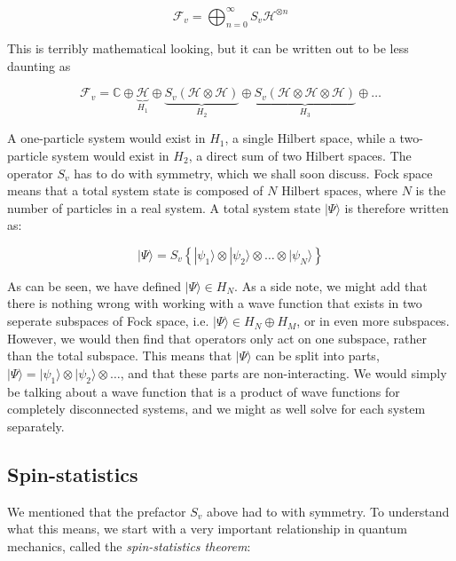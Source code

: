 \documentclass[10pt,twoside]{report}
\begin{document}
	\begin{equation}
		\mathcal{F}_v = \bigoplus_{n=0}^\infty S_v \mathcal{H}^{\otimes n}
	\end{equation}
	
	This is terribly mathematical looking, but it can be written out to be less daunting as
	
	\begin{equation}
		\mathcal{F}_v = \mathds{C}\oplus \underbrace{\mathcal{H}}_{H_1} \oplus \underbrace{S_v(\mathcal{H}\otimes \mathcal{H})}_{H_2} \oplus \underbrace{S_v(\mathcal{H}\otimes \mathcal{H}\otimes \mathcal{H})}_{H_3} \oplus \ldots
	\end{equation}
	
	
	A one-particle system would exist in $H_1$, a single Hilbert space, while a two-particle system would exist in $H_2$, a direct sum of two Hilbert spaces. The operator $S_v$ has to do with symmetry, which we shall soon discuss.
	Fock space means that a total system state is composed of $N$ Hilbert spaces, where $N$ is the number of particles in a real system. A total system state $|\Psi\rangle$ is therefore written as:
	
	\begin{equation}
		|\Psi\rangle = S_v\left\{|\psi_1\rangle \otimes |\psi_2\rangle \otimes \ldots \otimes |\psi_N\rangle\right\}
	\end{equation}
	
	As can be seen, we have defined $|\Psi\rangle \in H_N$. As a side note, we might add that there is nothing wrong with working with a wave function that exists in two seperate subspaces of Fock space, i.e. $|\Psi\rangle \in H_N\oplus H_M$, or in even more subspaces. However, we would then find that operators only act on one subspace, rather than the total subspace. This means that $|\Psi\rangle$ can be split into parts, $|\Psi\rangle = |\psi_1\rangle\otimes|\psi_2\rangle\otimes\ldots$, and that these parts are non-interacting. We would simply be talking about a wave function that is a product of wave functions for completely disconnected systems, and we might as well solve for each system separately. 
	
	\subsection{Spin-statistics}
	We mentioned that the prefactor $S_v$ above had to with symmetry. To understand what this means, we start with a very important relationship in quantum mechanics, called the \emph{spin-statistics theorem}:\\
	
\end{document}
